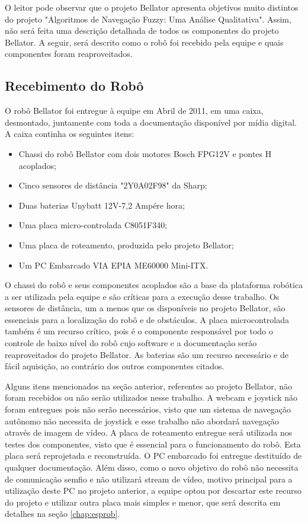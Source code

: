 O leitor pode observar que o projeto Bellator apresenta objetivos muito distintos do projeto "Algoritmos de Navegação Fuzzy: Uma Análise Qualitativa". Assim, não será feita uma descrição detalhada de todos os componentes do projeto Bellator. A seguir, será descrito como o robô foi recebido pela equipe e quais componentes foram reaproveitados.

\subsection{Recebimento do Robô}
\label{sec:recrobo}

O robô Bellator foi entregue à equipe em Abril de 2011, em uma caixa, desmontado, juntamente com toda a documentação disponível por mídia digital. A caixa continha os seguintes itens:

\begin{itemize}
\item Chassi do robô Bellator com dois motores Bosch FPG12V e pontes H acoplados;
\item Cinco sensores de distância "2Y0A02F98" da Sharp;
\item Duas baterias Unybatt 12V-7,2 Ampére hora;
\item Uma placa micro-controlada C8051F340;
\item Uma placa de roteamento, produzida pelo projeto Bellator;
\item Um PC Embarcado VIA EPIA ME60000 Mini-ITX.
\end{itemize}

O chassi do robô e seus componentes acoplados são a base da plataforma robótica a ser utilizada pela equipe e são críticas para a execução desse trabalho. Os sensores de distância, um a menos que os disponíveis no projeto Bellator, são essenciais para a localização do robô e de obstáculos. A placa microcontrolada também é um recurso crítico, pois é o componente responsável por todo o controle de baixo nível do robô cujo software e a documentação serão reaproveitados do projeto Bellator. As baterias são um recurso necessário e de fácil aquisição, ao contrário dos outros componentes citados.

Alguns itens mencionados na seção anterior, referentes ao projeto Bellator, não foram recebidos ou não serão utilizados nesse trabalho. A webcam e joystick não foram entregues pois não serão necessários, visto que um sistema de navegação autônomo não necessita de joystick e esse trabalho não abordará navegação através de imagem de vídeo. A placa de roteamento entregue será utilizada nos testes dos componentes, visto que é essencial para o funcionamento do robô. Esta placa será reprojetada e reconstruída. O PC embarcado foi entregue destituído de qualquer documentação. Além disso, como o novo objetivo do robô não necessita de comunicação semfio e não utilizará stream de vídeo, motivo principal para a utilização deste PC no projeto anterior, a equipe optou por descartar este recurso do projeto e utilizar outra placa mais simples e menor, que será descrita em detalhes na seção \ref{chap:esprob}.

